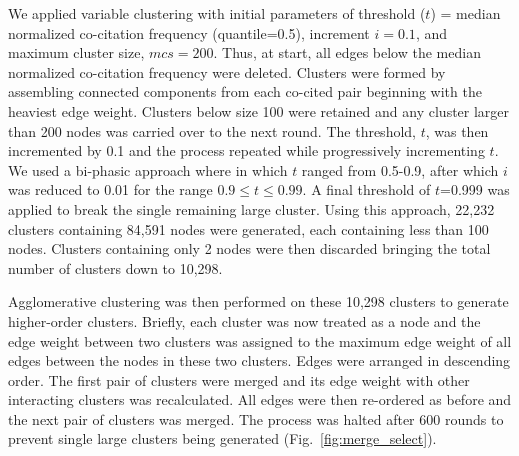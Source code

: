 We applied variable clustering with initial parameters of threshold ($t$) = median normalized co-citation frequency (quantile=0.5), increment $i = 0.1$, and maximum cluster size, $mcs=200$. Thus, at start, all edges below the median normalized co-citation frequency were deleted. Clusters were formed by assembling connected components from each co-cited pair beginning with the heaviest edge weight. Clusters below size 100 were retained and any cluster larger than 200 nodes was carried over to the next round. The threshold, $t$, was then incremented by 0.1 and the process repeated while progressively incrementing $t$.  We used a bi-phasic approach where in which $t$ ranged from 0.5-0.9, after which $i$ was reduced to 0.01 for the range $0.9 \leq t \leq 0.99$. A final threshold of $t$=0.999 was applied to break the single remaining large cluster. %
Using this approach, 22,232 clusters containing 84,591 nodes were generated, each containing less than 100 nodes. Clusters containing only 2 nodes were then discarded bringing the total number of clusters down to 10,298. 

Agglomerative clustering was then performed on these 10,298 clusters to generate higher-order clusters. Briefly, each cluster was now treated as a node and the edge weight between two clusters was assigned to the maximum edge weight of all edges between the nodes in these two clusters. Edges were arranged in descending order. The first pair of clusters were merged and its edge weight with other interacting clusters was recalculated. All edges were then re-ordered as before and the next pair of clusters was merged. The process was halted after 600 rounds to prevent single large clusters being generated (Fig.~\ref{fig:merge_select}).

